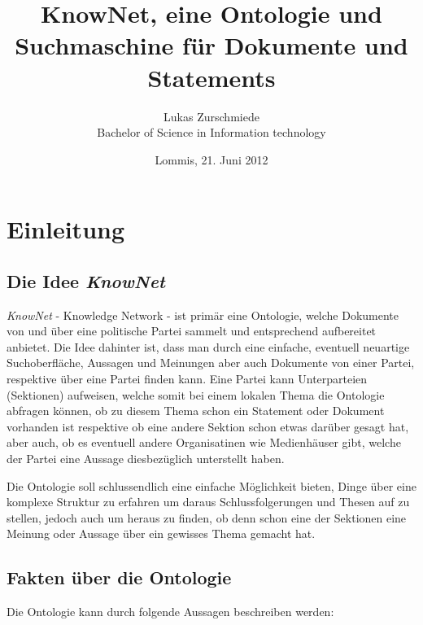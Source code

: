 \documentclass[
    11pt,
    latin1,
    a4paper,
    oneside
]{scrreprt}
\author{Lukas Zurschmiede\\Bachelor of Science in Information technology}
\date{Lommis, 21. Juni 2012}
\title{KnowNet, eine Ontologie und Suchmaschine f\"ur Dokumente und Statements}
\let\oldemph=\emph
\renewcommand{\emph}[1]{\index{#1}\oldemph{#1}}
\begin{document}
\maketitle

\newpage
\singlespacing
\tableofcontents

\pagebreak
\onehalfspacing
\setcounter{page}{1}

\chapter{Einleitung} \label{sec:introduction}

\section{Die Idee \emph{KnowNet}}

\emph{KnowNet} - Knowledge Network - ist prim\"ar eine Ontologie, welche Dokumente von und \"uber eine politische Partei sammelt und entsprechend aufbereitet anbietet. Die Idee dahinter ist, dass man durch eine einfache, eventuell neuartige Suchoberfl\"ache, Aussagen und Meinungen aber auch Dokumente von einer Partei, respektive \"uber eine Partei finden kann. Eine Partei kann Unterparteien (Sektionen) aufweisen, welche somit bei einem lokalen Thema die Ontologie abfragen k\"onnen, ob zu diesem Thema schon ein Statement oder Dokument vorhanden ist respektive ob eine andere Sektion schon etwas dar\"uber gesagt hat, aber auch, ob es eventuell andere Organisatinen wie Medienh\"auser gibt, welche der Partei eine Aussage diesbez\"uglich unterstellt haben.

Die Ontologie soll schlussendlich eine einfache M\"oglichkeit bieten, Dinge \"uber eine komplexe Struktur zu erfahren um daraus Schlussfolgerungen und Thesen auf zu stellen, jedoch auch um heraus zu finden, ob denn schon eine der Sektionen eine Meinung oder Aussage \"uber ein gewisses Thema gemacht hat.

\section{Fakten \"uber die Ontologie} \label{sec:facts}

Die Ontologie kann durch folgende Aussagen beschreiben werden:
\end{document}
